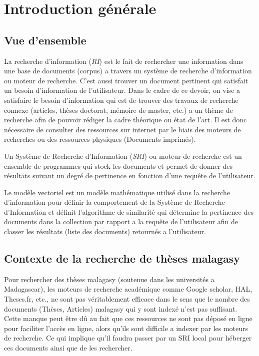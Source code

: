\chapter*{Introduction générale}

\section*{Vue d'ensemble}
La recherche d'information (\emph{RI}) est le fait de rechercher une information dans une base de documents (corpus) a travers un système de recherche d'information ou moteur de recherche. C'est aussi trouver un document pertinent qui satisfait un besoin d'information de l'utilisateur. Dans le cadre de ce devoir, on vise a satisfaire le besoin d'information qui est de trouver des travaux de recherche connexe (articles, thèses doctorat, mémoire de master, etc.) a un thème de recherche afin de pouvoir rédiger la cadre théorique ou état de l'art. Il est donc nécessaire de consulter des ressources sur internet par le biais des moteurs de recherches ou des ressources physiques (Documents imprimés).

Un Système de Recherche d'Information (\emph{SRI}) ou moteur de recherche est un ensemble de programmes qui stock les documents et permet de donner des résultats suivant un degré de pertinence en fonction d'une requête de l'utilisateur.

Le modèle vectoriel est un modèle mathématique utilisé dans la recherche d'information pour définir la comportement de la Système de Recherche d'Information et définit l'algorithme de similarité qui détermine la pertinence des documents dans la collection par rapport a la requête de l'utilisateur afin de classer les résultats (liste des documents) retournés a l'utilisateur.

\section*{Contexte de la recherche de thèses malagasy}
Pour rechercher des thèses malagasy (soutenue dans les universités a Madagascar), les moteurs de recherche académique comme Google scholar, HAL, Theses.fr, etc., ne sont pas véritablement efficace dans le sens que le nombre des documents (Thèses, Articles) malagasy qui y sont indexé n'est pas suffisant. Cette manque peut être dû au fait que ces ressources ne sont pas déposé en ligne pour faciliter l'accès en ligne, alors qu'ils sont difficile a indexer par les moteurs de recherche. Ce qui implique qu'il faudra passer par un SRI local pour héberger ces documents ainsi que de les rechercher.

